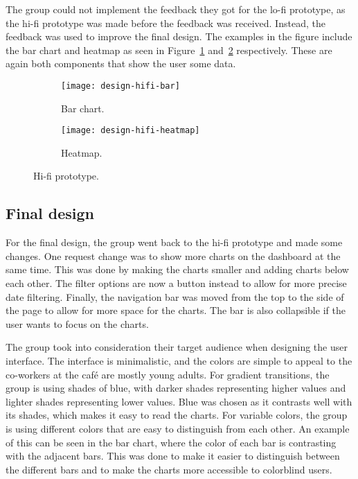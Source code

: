 The group could not implement the feedback they got for the lo-fi prototype, as the hi-fi prototype was made before
the feedback was received.
Instead, the feedback was used to improve the final design.
The examples in the figure include the bar chart and heatmap as seen in Figure~\ref{subfig:hifi-bar}
and~\ref{subfig:hifi-heatmap} respectively.
These are again both components that show the user some data.

\begin{figure}[H]
    \centering
    \begin{subfigure}{.75\textwidth}
        \centering
        \texttt{[image: design-hifi-bar]}
        \caption{Bar chart.
        }\label{subfig:hifi-bar}
    \end{subfigure}
    \par\medskip
    \begin{subfigure}{.75\textwidth}
        \centering
        \texttt{[image: design-hifi-heatmap]}
        \caption{Heatmap.
        }\label{subfig:hifi-heatmap}
    \end{subfigure}
    \caption{Hi-fi prototype.
    }\label{fig:hifi-prototype}
\end{figure}

\subsection{Final design}\label{subsec:final-design}

For the final design, the group went back to the hi-fi prototype and made some changes.
One request change was to show more charts on the dashboard at the same time.
This was done by making the charts smaller and adding charts below each other.
The filter options are now a button instead to allow for more precise date filtering.
Finally, the navigation bar was moved from the top to the side of the page to allow for more space for the charts.
The bar is also collapsible if the user wants to focus on the charts.

The group took into consideration their target audience when designing the user interface.
The interface is minimalistic, and the colors are simple to appeal to the co-workers at the café are mostly young adults.
For gradient transitions, the group is using shades of blue, with darker shades representing higher values and lighter
shades representing lower values.
Blue was chosen as it contrasts well with its shades, which makes it easy to read the charts.
For variable colors, the group is using different colors that are easy to distinguish from each other.
An example of this can be seen in the bar chart, where the color of each bar is contrasting with the adjacent bars.
This was done to make it easier to distinguish between the different bars and to make the charts more accessible to
colorblind users.

